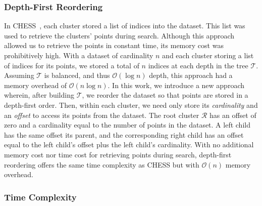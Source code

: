 



\subsubsection{Depth-First Reordering}
\label{sec:methods:clustering:depth-first-reordering}

In CHESS~\cite{ishaq2019clustered}, each cluster stored a list of indices into the dataset.
This list was used to retrieve the clusters' points during search.
Although this approach allowed us to retrieve the points in constant time, its memory cost was prohibitively high.
With a dataset of cardinality $n$ and each cluster storing a list of indices for its points, we stored a total of $n$ indices at each depth in the tree $\mathcal{T}$.
Assuming $\mathcal{T}$ is balanced, and thus $\mathcal{O}(\log n)$ depth, this approach had a memory overhead of $\mathcal{O}(n \log n)$.
In this work, we introduce a new approach wherein, after building $\mathcal{T}$, we reorder the dataset so that points are stored in a depth-first order.
Then, within each cluster, we need only store its \textit{cardinality} and an \textit{offset} to access its points from the dataset.
The root cluster $\mathcal{R}$ has an offset of zero and a cardinality equal to the number of points in the dataset.
A left child has the same offset its parent, and the corresponding right child has an offset equal to the left child's offset plus the left child's cardinality.
With no additional memory cost nor time cost for retrieving points during search, depth-first reordering offers the same time complexity as CHESS but with $\mathcal{O}(n)$ memory overhead.


\subsubsection{Time Complexity}
\label{sec:methods:clustering:time-complexity}

